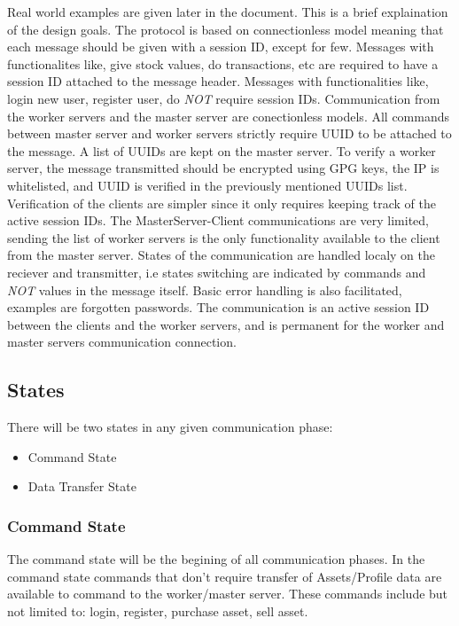 \documentclass[a4paper]{article}
\begin{document}
Real world examples are given later in the document. This is a brief 
explaination of the design goals. The protocol is based on connectionless model
meaning that each message should be given with a session ID, except for few.
Messages with functionalites like, give stock values, do transactions, etc are
required to have a session ID attached to the message header. Messages with
functionalities like, login new user, register user, do \emph{NOT} require
session IDs. Communication from the worker servers and the master server are
conectionless models. All commands between master server and worker servers
strictly require UUID to be attached to the message. A list of UUIDs are kept 
on the master server. To verify a worker server, the message transmitted should 
be encrypted using GPG keys, the IP is whitelisted, and UUID is verified in the 
previously mentioned UUIDs list. Verification of the clients are simpler since 
it only requires keeping track of the active session IDs. The 
MasterServer-Client communications are very limited, sending the list of
worker servers is the only functionality available to the client from the
master server. States of the communication are handled localy on the reciever 
and transmitter, i.e states switching are indicated by commands and \emph{NOT} 
values in the message itself. Basic error handling is also facilitated, 
examples are forgotten passwords. The communication is an active session ID
between the clients and the worker servers, and is permanent for the worker and
master servers communication connection.

\subsection{States}
\label{protocol_states}
There will be two states in any given communication phase:
\begin{itemize}
	\item Command State
	\item Data Transfer State
\end{itemize}

\subsubsection{Command State}
\label{protocol_state_command}
The command state will be the begining of all communication phases. In the
command state commands that don't require transfer of Assets/Profile data are
available to command to the worker/master server. These commands include but
not limited to: login, register, purchase asset, sell asset.
\end{document}
